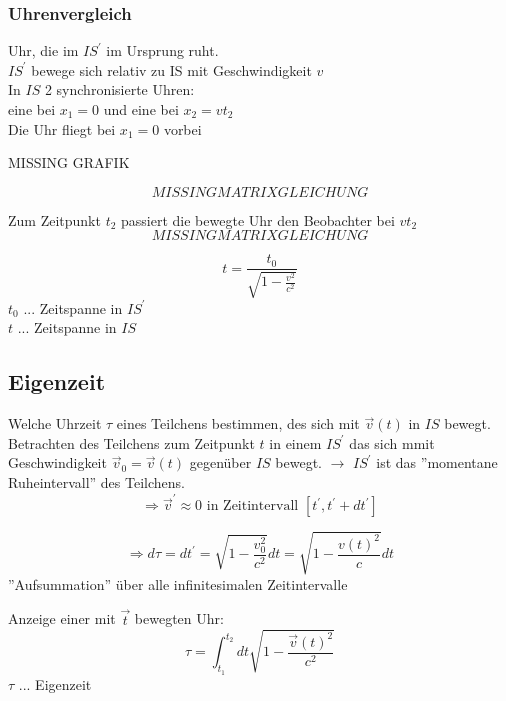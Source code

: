 \documentclass[a4paper, 11pt]{article}
\numberwithin{equation}{section}
\begin{document}
\subsubsection*{Uhrenvergleich}
Uhr, die im $IS^\prime$ im Ursprung ruht.\\
$IS^\prime$ bewege sich relativ zu IS mit Geschwindigkeit $v$\\
In $IS$ 2 synchronisierte Uhren:\\
eine bei $x_1=0$ und eine bei $x_2 = v t_2$\\
Die Uhr fliegt bei $x_1 = 0$ vorbei

MISSING GRAFIK

\begin{equation*}
MISSING MATRIXGLEICHUNG
\end{equation*}

Zum Zeitpunkt $t_2$ passiert die bewegte Uhr den Beobachter bei $vt_2$
\begin{equation*}
MISSING MATRIXGLEICHUNG
\end{equation*}

\begin{equation*}
\boxed{t= \dfrac{t_0}{\sqrt{1-\frac{v^2}{c^2}}}}
\end{equation*}
$t_0$ ... Zeitspanne in $IS^\prime$\\
$t$ ... Zeitspanne in $IS$


\subsection*{Eigenzeit}
Welche Uhrzeit  $\tau$ eines Teilchens bestimmen, des sich mit $\vec{v}(t)$ in $IS$ bewegt. Betrachten des Teilchens zum Zeitpunkt $t$ in einem $IS^\prime$ das sich mmit Geschwindigkeit $\vec{v}_0 = \vec{v}(t)$ gegenüber $IS$ bewegt. $\rightarrow$ $IS^\prime$ ist das ''momentane Ruheintervall'' des Teilchens.
\begin{equation*}
\Rightarrow \vec{v}^\prime \approx 0 \text{ in Zeitintervall } [t^\prime , t^\prime + dt^\prime]
\end{equation*}

\begin{equation}
\Rightarrow d\tau = dt^\prime = \sqrt{1 - \frac{v_0^2}{c^2}} dt = \sqrt{1 - \frac{v(t)^2}{c}} dt
\end{equation}
''Aufsummation'' über alle infinitesimalen Zeitintervalle


Anzeige einer mit $\vec{t}$ bewegten Uhr:
\begin{equation}
\boxed{
\tau = \int^{t_2}_{t_1} dt \sqrt{1-\frac{\vec{v}(t)^2}{c^2}}}
\end{equation}
$\tau$ ... Eigenzeit
\end{document}
